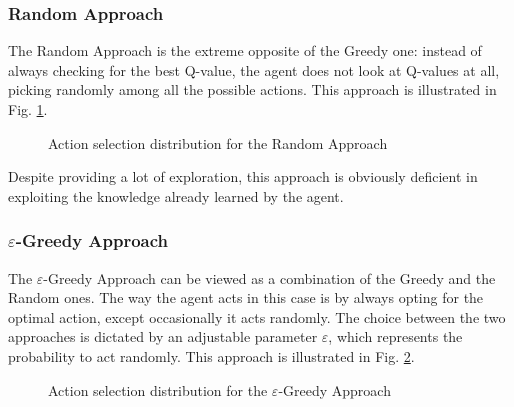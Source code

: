 \documentclass[a4paper, 12pt]{article}
\numberwithin{equation}{section}
\begin{document}
\subsubsection{Random Approach}

The Random Approach is the extreme opposite of the Greedy one: instead of always checking for the best Q-value, the agent does not look at Q-values at all, picking randomly among all the possible actions. This approach is illustrated in Fig. \ref{fig:random}.

\begin{figure}[h]
	\centering
		\caption{Action selection distribution for the Random Approach}
	\label{fig:random}
\end{figure}

Despite providing a lot of exploration, this approach is obviously deficient in exploiting the knowledge already learned by the agent.


\subsubsection{$\varepsilon$-Greedy Approach}

The $\varepsilon$-Greedy Approach can be viewed as a combination of the Greedy and the Random ones. The way the agent acts in this case is by always opting for the optimal action, except occasionally it acts randomly. The choice between the two approaches is dictated by an adjustable parameter $\varepsilon$, which represents the probability to act randomly. This approach is illustrated in Fig. \ref{fig:epsilon}.

\begin{figure}[h]
	\centering
		\caption{Action selection distribution for the $\varepsilon$-Greedy Approach}
	\label{fig:epsilon}
\end{figure}
\end{document}
